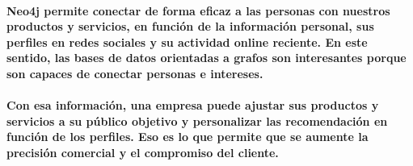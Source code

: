 	\paragraph{Neo4j permite conectar de forma eficaz a las personas con nuestros productos y servicios, en función de la información personal, sus perfiles en redes sociales y su actividad online reciente. En este sentido, las bases de datos orientadas a grafos son interesantes porque son capaces de conectar personas e intereses.}
	\paragraph{Con esa información, una empresa puede ajustar sus productos y servicios a su público objetivo y personalizar las recomendación en función de los perfiles. Eso es lo que permite que se aumente la precisión comercial y el compromiso del cliente.}
    
